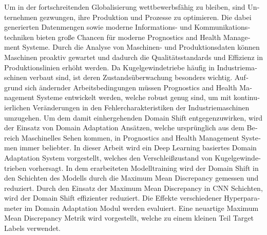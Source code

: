 \begin{otherlanguage}{ngerman} %
Um in der fortschreitenden Globalisierung wettbewerbsfähig zu bleiben, sind Unternehmen gezwungen, ihre Produktion und Prozesse zu optimieren. Die dabei generierten Datenmengen sowie moderne Informations- und Kommunikationstechniken bieten große Chancen für moderne Prognostics and Health Management Systeme. Durch die Analyse von Maschinen- und Produktionsdaten können Maschinen proaktiv gewartet und dadurch die Qualitätsstandards und Effizienz in Produktionslinien erhöht werden. Da Kugelgewindetriebe häufig in Industriemaschinen verbaut sind, ist deren Zustandsüberwachung besonders wichtig. Aufgrund sich ändernder Arbeitsbedingungen müssen Prognostics and Health Management Systeme entwickelt werden, welche robust genug sind, um mit kontinuierlichen Veränderungen in den Fehlercharakteristiken der Industriemaschinen umzugehen. Um dem damit einhergehenden Domain Shift entgegenzuwirken, wird der Einsatz von Domain Adaptation Ansätzen, welche ursprünglich aus dem Bereich Maschinelles Sehen kommen, in Prognostics and Health Management Systemen immer beliebter. In dieser Arbeit wird ein Deep Learning basiertes Domain Adaptation System vorgestellt, welches den Verschleißzustand von Kugelgewindetrieben vorhersagt. In dem erarbeiteten Modelltraining wird der Domain Shift in den Schichten des Modells durch die Maximum Mean Discrepancy gemessen und reduziert. Durch den Einsatz der Maximum Mean Discrepancy in CNN Schichten, wird der Domain Shift effizienter reduziert. Die Effekte verschiedener Hyperparameter im Domain Adaptation Modul werden evaluiert. Eine neuartige Maximum Mean Discrepancy Metrik wird vorgestellt, welche zu einem kleinen Teil Target Labels verwendet.



\end{otherlanguage}


\makeatletter
{}
{\renewcommand{\abstractname}{Abstract}}
{\renewcommand{\abstractname}{Kurzfassung}}
\makeatother